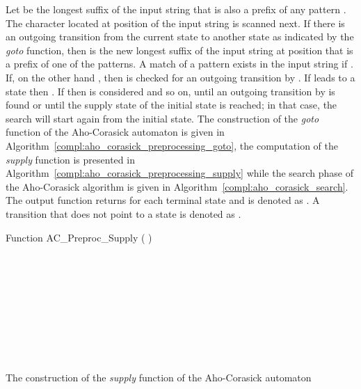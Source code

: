 \documentclass{ws-ijait}
\begin{document}
Let  be the longest suffix of the input string  that is also a prefix of any pattern . The character  located at position  of the input string is scanned next. If there is an outgoing transition from the current state  to another state  as indicated by the \textit{goto} function, then  is the new longest suffix of the input string at position  that is a prefix of one of the patterns. A match of a pattern exists in the input string if . If, on the other hand , then  is checked for an outgoing transition by . If  leads to a state  then . If  then  is considered and so on, until an outgoing transition by  is found or until the supply state of the initial state is reached; in that case, the search will start again from the initial state. The construction of the \textit{goto} function of the Aho-Corasick automaton is given in Algorithm~\ref{compl:aho_corasick_preprocessing_goto}, the computation of the \textit{supply} function is presented in Algorithm~\ref{compl:aho_corasick_preprocessing_supply} while the search phase of the Aho-Corasick algorithm is given in Algorithm~\ref{compl:aho_corasick_search}. The output function returns  for each terminal state  and is denoted as . A transition that does not point to a state is denoted as .

\begin{algorithm}[H]

Function AC\_Preproc\_Supply (  )\\

\ForAll{  } {


	\eIf{} {
		\\
	}{
	
		\\
	
	}
}

 {

	\ForAll{  } {

		\\
		
		\If{} {

			\\
		
			\While{ }{
	
				\\
			}
			
			\\
		}
	}
}

\caption{The construction of the \textit{supply} function  of the Aho-Corasick automaton}
\label{compl:aho_corasick_preprocessing_supply}
\end{algorithm}
\end{document}
